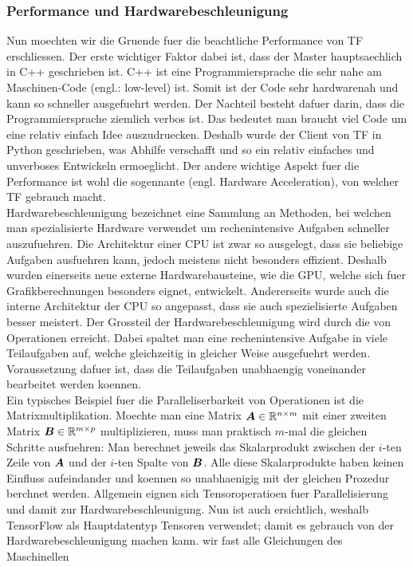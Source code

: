 \subsubsection{Performance und Hardwarebeschleunigung}
Nun moechten wir die Gruende fuer die beachtliche Performance von TF erschliessen.
Der erste wichtiger Faktor dabei ist, dass der Master hauptsaechlich in C++
geschrieben ist. C++ ist eine Programmiersprache die sehr nahe am Maschinen-Code
(engl.: low-level) ist. Somit ist der Code sehr hardwarenah und kann so
schneller ausgefuehrt werden. Der Nachteil besteht dafuer darin, dass die Programmiersprache
ziemlich verbos ist. Das bedeutet man braucht viel Code um eine relativ einfach Idee
auszudruecken. Deshalb wurde der Client von TF in Python geschrieben, was
Abhilfe verschafft und so ein relativ einfaches und unverboses Entwickeln ermoeglicht.
\para{}
\para{}
Der andere wichtige Aspekt fuer die Performance ist wohl die sogennante
 (engl. Hardware Acceleration), von welcher TF
gebrauch macht. \\
Hardwarebeschleunigung bezeichnet eine Sammlung an Methoden,
bei welchen man spezialisierte Hardware verwendet um rechenintensive Aufgaben
schneller auszufuehren. Die Architektur einer CPU ist zwar so ausgelegt, dass
sie beliebige Aufgaben ausfuehren kann, jedoch meistens nicht besonders
effizient. Deshalb wurden einerseits neue externe Hardwarebausteine, wie die
GPU, welche sich fuer Grafikberechnungen besonders eignet, entwickelt.
Andererseits wurde auch die interne Architektur der CPU so angepasst, dass sie
auch spezielisierte Aufgaben besser meistert.
\para{}
Der Grossteil der Hardwarebeschleunigung wird durch die
 von Operationen erreicht. Dabei spaltet man eine
rechenintensive Aufgabe in viele Teilaufgaben auf, welche gleichzeitig in
gleicher Weise ausgefuehrt werden. Voraussetzung dafuer ist, dass die
Teilaufgaben unabhaengig voneinander bearbeitet werden koennen. \\
Ein typisches Beispiel fuer die Paralleliserbarkeit von Operationen ist die
Matrixmultiplikation. Moechte man eine Matrix $\bm{A} \in \mathbb{R}^{n \times m}$ mit
einer zweiten Matrix $\bm{B} \in \mathbb{R}^{m \times p}$ multiplizieren, muss man
praktisch $m$-mal die gleichen Schritte ausfuehren: Man berechnet jeweils das
Skalarprodukt zwischen der $i$-ten Zeile von $\bm{A}$ und der $i$-ten Spalte
von $\bm{B}$. Alle diese Skalarprodukte haben keinen Einfluss aufeindander und
koennen so unabhaenigig mit der gleichen Prozedur berchnet werden.
\para{}
Allgemein eignen sich Tensoroperatioen fuer Parallelisierung und damit zur Hardwarebeschleunigung.
Nun ist auch ersichtlich, weshalb TensorFlow als Hauptdatentyp Tensoren
verwendet; damit es gebrauch von der Hardwarebeschleunigung machen kann. wir fast alle Gleichungen des Maschinellen

